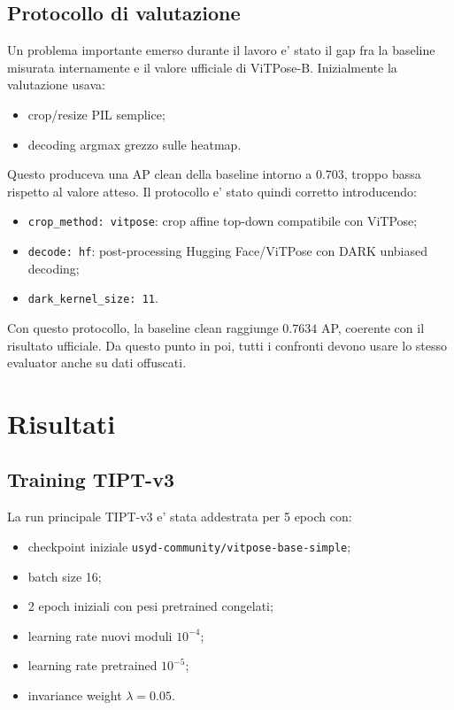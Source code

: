 \documentclass[11pt,a4paper]{article}
\newcommand{\code}[1]{\texttt{#1}}
\newcommand{\tipt}{TIPT-v3}
\newcommand{\vitpose}{ViTPose-B}
\begin{document}
\subsection{Protocollo di valutazione}

Un problema importante emerso durante il lavoro e' stato il gap fra la baseline
misurata internamente e il valore ufficiale di \vitpose. Inizialmente la
valutazione usava:

\begin{itemize}[leftmargin=1.2em]
  \item crop/resize PIL semplice;
  \item decoding argmax grezzo sulle heatmap.
\end{itemize}

Questo produceva una AP clean della baseline intorno a $0.703$, troppo bassa
rispetto al valore atteso. Il protocollo e' stato quindi corretto introducendo:

\begin{itemize}[leftmargin=1.2em]
  \item \code{crop\_method: vitpose}: crop affine top-down compatibile con
  ViTPose;
  \item \code{decode: hf}: post-processing Hugging Face/ViTPose con DARK
  unbiased decoding;
  \item \code{dark\_kernel\_size: 11}.
\end{itemize}

Con questo protocollo, la baseline clean raggiunge $0.7634$ AP, coerente con il
risultato ufficiale. Da questo punto in poi, tutti i confronti devono usare lo
stesso evaluator anche su dati offuscati.

\section{Risultati}

\subsection{Training \tipt{}}

La run principale \tipt{} e' stata addestrata per 5 epoch con:

\begin{itemize}[leftmargin=1.2em]
  \item checkpoint iniziale \code{usyd-community/vitpose-base-simple};
  \item batch size 16;
  \item 2 epoch iniziali con pesi pretrained congelati;
  \item learning rate nuovi moduli $10^{-4}$;
  \item learning rate pretrained $10^{-5}$;
  \item invariance weight $\lambda=0.05$.
\end{itemize}
\end{document}
